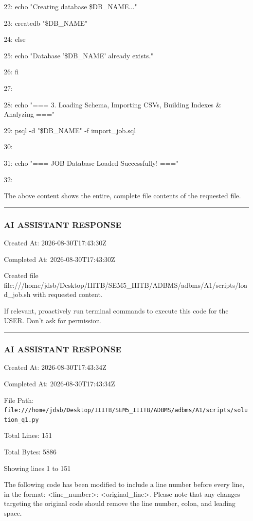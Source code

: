 \documentclass[11pt,a4paper]{article}
\begin{document}
{22:     echo "Creating database \$DB\_NAME..."

23:     createdb "\$DB\_NAME"

24: else

25:     echo "Database '\$DB\_NAME' already exists."

26: fi

27:

28: echo "=== 3. Loading Schema, Importing CSVs, Building Indexes \& Analyzing ==="

29: psql -d "\$DB\_NAME" -f import\_job.sql

30:

31: echo "=== JOB Database Loaded Successfully! ==="

32:

The above content shows the entire, complete file contents of the requested file.


\hrule

\subsubsection{AI ASSISTANT RESPONSE}

Created At: 2026-08-30T17:43:30Z

Completed At: 2026-08-30T17:43:30Z

Created file file:///home/jdsb/Desktop/IIITB/SEM5\_IIITB/ADBMS/adbms/A1/scripts/load\_job.sh with requested content.

If relevant, proactively run terminal commands to execute this code for the USER. Don't ask for permission.


\hrule

\subsubsection{AI ASSISTANT RESPONSE}

Created At: 2026-08-30T17:43:34Z

Completed At: 2026-08-30T17:43:34Z

File Path: \texttt{file:///home/jdsb/Desktop/IIITB/SEM5\_IIITB/ADBMS/adbms/A1/scripts/solution\_q1.py}

Total Lines: 151

Total Bytes: 5886

Showing lines 1 to 151

The following code has been modified to include a line number before every line, in the format: <line\_number>: <original\_line>. Please note that any changes targeting the original code should remove the line number, colon, and leading space.

}
\end{document}
